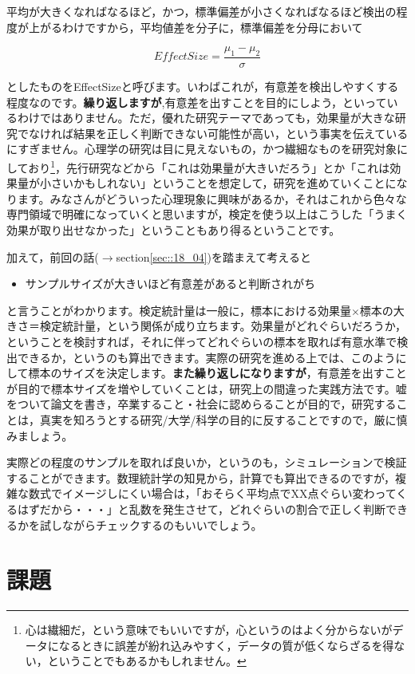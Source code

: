 \documentclass{ltjsarticle}
\begin{document}
平均が大きくなればなるほど，かつ，標準偏差が小さくなればなるほど検出の程度が上がるわけですから，平均値差を分子に，標準偏差を分母において

$$ EffectSize =  \frac{\mu_1-\mu_2}{\sigma} $$

としたものをEffectSizeと呼びます。いわばこれが，有意差を検出しやすくする程度なのです。\textbf{繰り返しますが},有意差を出すことを目的にしよう，といっているわけではありません。ただ，優れた研究テーマであっても，効果量が大きな研究でなければ結果を正しく判断できない可能性が高い，という事実を伝えているにすぎません。心理学の研究は目に見えないもの，かつ繊細なものを研究対象にしており\footnote{心は繊細だ，という意味でもいいですが，心というのはよく分からないがデータになるときに誤差が紛れ込みやすく，データの質が低くならざるを得ない，ということでもあるかもしれません。}，先行研究などから「これは効果量が大きいだろう」とか「これは効果量が小さいかもしれない」ということを想定して，研究を進めていくことになります。みなさんがどういった心理現象に興味があるか，それはこれから色々な専門領域で明確になっていくと思いますが，検定を使う以上はこうした「うまく効果が取り出せなかった」ということもあり得るということです。

加えて，前回の話($\to$section\ref{sec::18_04})を踏まえて考えると
\begin{itemize}
    \item サンプルサイズが大きいほど有意差があると判断されがち
\end{itemize}
と言うことがわかります。検定統計量は一般に，標本における効果量$\times$標本の大きさ＝検定統計量，という関係が成り立ちます。効果量がどれぐらいだろうか，ということを検討すれば，それに伴ってどれぐらいの標本を取れば有意水準で検出できるか，というのも算出できます。実際の研究を進める上では、このようにして標本のサイズを決定します。\textbf{また繰り返しになりますが}，有意差を出すことが目的で標本サイズを増やしていくことは，研究上の間違った実践方法です。嘘をついて論文を書き，卒業すること・社会に認めらることが目的で，研究することは，真実を知ろうとする研究/大学/科学の目的に反することですので，厳に慎みましょう。

実際どの程度のサンプルを取れば良いか，というのも，シミュレーションで検証することができます。数理統計学の知見から，計算でも算出できるのですが，複雑な数式でイメージしにくい場合は，「おそらく平均点でXX点ぐらい変わってくるはずだから・・・」と乱数を発生させて，どれぐらいの割合で正しく判断できるかを試しながらチェックするのもいいでしょう。
\section{課題}
\end{document}
